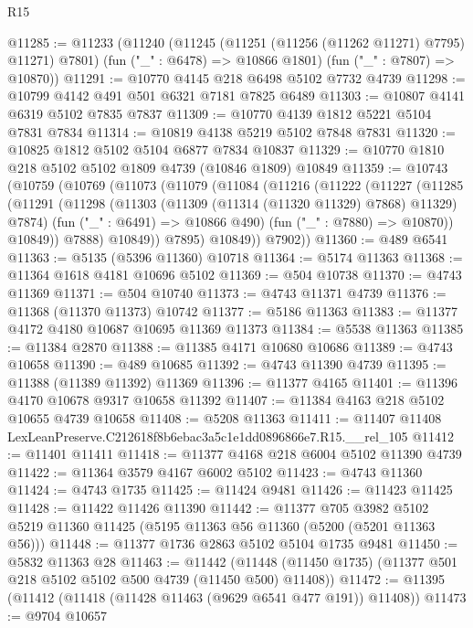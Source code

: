 \begin{lexlean}{R15}
\begin{coremodule}
{{{{{{{{{{{@11285 := @11233
    (@11240
      (@11245 (@11251 (@11256 (@11262 @11271) @7795) @11271) @7801)
      (fun ("_" : @6478) => @10866 @1801)
      (fun ("_" : @7807) => @10870))
@11291 := @10770 @4145 @218 @6498 @5102 @7732 @4739
@11298 := @10799 @4142 @491 @501 @6321 @7181 @7825 @6489
@11303 := @10807 @4141 @6319 @5102 @7835 @7837
@11309 := @10770 @4139 @1812 @5221 @5104 @7831 @7834
@11314 := @10819 @4138 @5219 @5102 @7848 @7831
@11320 := @10825 @1812 @5102 @5104 @6877 @7834 @10837
@11329 := @10770 @1810 @218 @5102 @5102 @1809 @4739 (@10846 @1809) @10849
@11359 := @10743
    (@10759
      (@10769
        (@11073
          (@11079
            (@11084
              (@11216
                (@11222
                  (@11227
                    (@11285
                      (@11291
                        (@11298
                          (@11303 (@11309 (@11314 (@11320 @11329) @7868) @11329) @7874)
                          (fun ("_" : @6491) => @10866 @490)
                          (fun ("_" : @7880) => @10870))
                        @10849))
                    @7888)
                  @10849))
              @7895)
            @10849))
        @7902))
@11360 := @489 @6541
@11363 := @5135 (@5396 @11360) @10718
@11364 := @5174 @11363
@11368 := @11364 @1618 @4181 @10696 @5102
@11369 := @504 @10738
@11370 := @4743 @11369
@11371 := @504 @10740
@11373 := @4743 @11371 @4739
@11376 := @11368 (@11370 @11373) @10742
@11377 := @5186 @11363
@11383 := @11377 @4172 @4180 @10687 @10695 @11369 @11373
@11384 := @5538 @11363
@11385 := @11384 @2870
@11388 := @11385 @4171 @10680 @10686
@11389 := @4743 @10658
@11390 := @489 @10685
@11392 := @4743 @11390 @4739
@11395 := @11388 (@11389 @11392) @11369
@11396 := @11377 @4165
@11401 := @11396 @4170 @10678 @9317 @10658 @11392
@11407 := @11384 @4163 @218 @5102 @10655 @4739 @10658
@11408 := @5208 @11363
@11411 := @11407 @11408 LexLeanPreserve.C212618f8b6ebac3a5c1e1dd0896866e7.R15.__rel_105
@11412 := @11401 @11411
@11418 := @11377 @4168 @218 @6004 @5102 @11390 @4739
@11422 := @11364 @3579 @4167 @6002 @5102
@11423 := @4743 @11360
@11424 := @4743 @1735
@11425 := @11424 @9481
@11426 := @11423 @11425
@11428 := @11422 @11426 @11390
@11442 := @11377
    @705
    @3982
    @5102
    @5219
    @11360
    @11425
    (@5195 @11363 @56 @11360 (@5200 (@5201 @11363 @56)))
@11448 := @11377 @1736 @2863 @5102 @5104 @1735 @9481
@11450 := @5832 @11363 @28
@11463 := @11442
    (@11448 (@11450 @1735) (@11377 @501 @218 @5102 @5102 @500 @4739 (@11450 @500) @11408))
@11472 := @11395 (@11412 (@11418 (@11428 @11463 (@9629 @6541 @477 @191)) @11408))
@11473 := @9704 @10657
}}}}}}}}}}}
\end{coremodule}
\end{lexlean}
